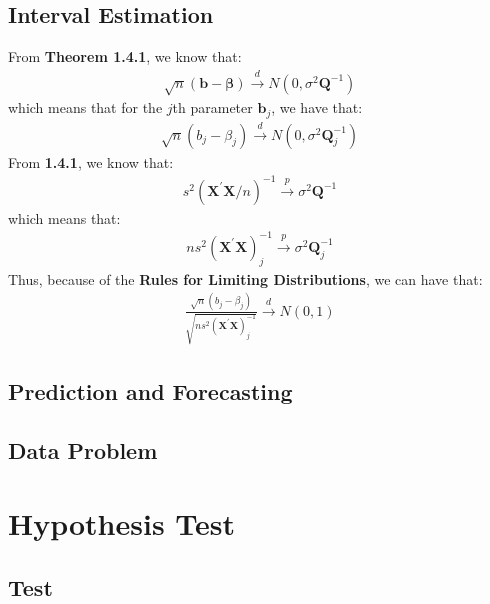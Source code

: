 \documentclass{article}
\begin{document}
\subsection{Interval Estimation}
From \textbf{Theorem 1.4.1}, we know that:
	\begin{align*}
		\sqrt{n}(\boldsymbol{b} - \boldsymbol{\beta}) \xrightarrow{d} N(0, \sigma^2 \boldsymbol{Q}^{-1})
	\end{align*}
which means that for the $j$th parameter $\boldsymbol{b}_j$, we have that:
	\begin{align*}
		\sqrt{n}(b_j - \beta_j) \xrightarrow{d} N(0, \sigma^2 \boldsymbol{Q}^{-1}_j)
	\end{align*}
From \textbf{1.4.1}, we know that:
	\begin{align*}
		s^2 (\boldsymbol{X}^\prime \boldsymbol{X} / n)^{-1}  \xrightarrow{p} \sigma^2 \boldsymbol{Q}^{-1}
	\end{align*}
which means that:
	\begin{align*}
		n s^2 (\boldsymbol{X}^\prime \boldsymbol{X})^{-1}_j \xrightarrow{p} \sigma^2 \boldsymbol{Q}^{-1}_j
	\end{align*}
Thus, because of the \textbf{Rules for Limiting Distributions}, we can have that:
	\begin{align*}
		\frac{\sqrt{n}(b_j - \beta_j)}{\sqrt{n s^2 (\boldsymbol{X}^\prime \boldsymbol{X})^{-1}_j}} \xrightarrow{d} N(0, 1)
	\end{align*}


\subsection{Prediction and Forecasting}


\subsection{Data Problem}



\newpage
\section{Hypothesis Test}
\subsection{Test}
\end{document}
